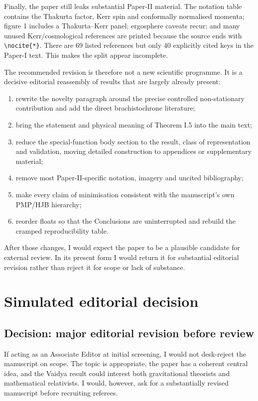 \documentclass[11pt,a4paper]{article}
\begin{document}
Finally, the paper still leaks substantial Paper-II material.  The notation table contains the
Thakurta factor, Kerr spin and conformally normalised momenta; figure 1 includes a Thakurta--Kerr
panel; ergosphere caveats recur; and many unused Kerr/cosmological references are printed because
the source ends with \verb|\nocite{*}|.  There are 69 listed references but only 40 explicitly
cited keys in the Paper-I text.  This makes the split appear incomplete.

The recommended revision is therefore not a new scientific programme.  It is a decisive
editorial reassembly of results that are largely already present:

\begin{enumerate}
  \item rewrite the novelty paragraph around the precise controlled non-stationary contribution
  and add the direct brachistochrone literature;
  \item bring the statement and physical meaning of Theorem I.5 into the main text;
  \item reduce the special-function body section to the result, class of representation and
  validation, moving detailed construction to appendices or supplementary material;
  \item remove most Paper-II-specific notation, imagery and uncited bibliography;
  \item make every claim of minimisation consistent with the manuscript's own PMP/HJB hierarchy;
  \item reorder floats so that the Conclusions are uninterrupted and rebuild the cramped
  reproducibility table.
\end{enumerate}

After those changes, I would expect the paper to be a plausible candidate for external review.
In its present form I would return it for substantial editorial revision rather than reject it
for scope or lack of substance.

\section{Simulated editorial decision}

\subsection{Decision: major editorial revision before review}

If acting as an Associate Editor at initial screening, I would not desk-reject the manuscript on
scope.  The topic is appropriate, the paper has a coherent central idea, and the Vaidya result
could interest both gravitational theorists and mathematical relativists.  I would, however,
ask for a substantially revised manuscript before recruiting referees.
\end{document}
